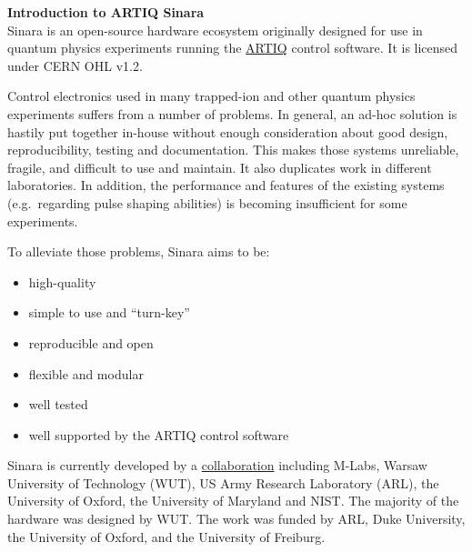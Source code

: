 \textbf {\Large Introduction to ARTIQ Sinara}\\

Sinara is an open-source hardware ecosystem originally designed for use
in quantum physics experiments running the
\href{https://m-labs.hk/artiq/}{ARTIQ} control software. It is licensed
under CERN OHL v1.2.

Control electronics used in many trapped-ion and other quantum physics
experiments suffers from a number of problems. In general, an ad-hoc
solution is hastily put together in-house without enough consideration
about good design, reproducibility, testing and documentation. This
makes those systems unreliable, fragile, and difficult to use and
maintain. It also duplicates work in different laboratories. In
addition, the performance and features of the existing systems
(e.g.~regarding pulse shaping abilities) is becoming insufficient for
some experiments.

To alleviate those problems, Sinara aims to be:

\begin{itemize}

\item
  high-quality
\item
  simple to use and ``turn-key''
\item
  reproducible and open
\item
  flexible and modular
\item
  well tested
\item
  well supported by the ARTIQ control software
\end{itemize}


Sinara is currently developed by a \href{team}{collaboration} including
M-Labs, Warsaw University of Technology (WUT), US Army Research
Laboratory (ARL), the University of Oxford, the University of Maryland
and NIST. The majority of the hardware was designed by WUT. The work was
funded by ARL, Duke University, the University of Oxford, and the
University of Freiburg.\\

%

